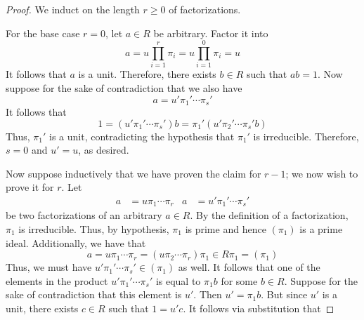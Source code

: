 \documentclass[../notes.tex]{subfiles}
\begin{document}
\begin{itemize}
\begin{proof}


        We induct on the length $r\geq 0$ of factorizations.\par
        For the base case $r=0$, let $a\in R$ be arbitrary. Factor it into
        \begin{equation*}
            a = u\prod_{i=1}^r\pi_i
            = u\prod_{i=1}^0\pi_i
            = u
        \end{equation*}
        It follows that $a$ is a unit. Therefore, there exists $b\in R$ such that $ab=1$. Now suppose for the sake of contradiction that we also have
        \begin{equation*}
            a = u'\pi_1'\cdots\pi_s'
        \end{equation*}
        It follows that
        \begin{equation*}
            1 = (u'\pi_1'\cdots\pi_s')b
            = \pi_1'(u'\pi_2'\cdots\pi_s'b)
        \end{equation*}
        Thus, $\pi_1'$ is a unit, contradicting the hypothesis that $\pi_1'$ is irreducible. Therefore, $s=0$ and $u'=u$, as desired.\par
        Now suppose inductively that we have proven the claim for $r-1$; we now wish to prove it for $r$. Let
        \begin{align*}
            a &= u\pi_1\cdots\pi_r&
            a &= u'\pi_1'\cdots\pi_s'
        \end{align*}
        be two factorizations of an arbitrary $a\in R$. By the definition of a factorization, $\pi_1$ is irreducible. Thus, by hypothesis, $\pi_1$ is prime and hence $(\pi_1)$ is a prime ideal. Additionally, we have that
        \begin{equation*}
            a = u\pi_1\cdots\pi_r
            = (u\pi_2\cdots\pi_r)\pi_1
            \in R\pi_1
            = (\pi_1)
        \end{equation*}
        Thus, we must have $u'\pi_1'\cdots\pi_s'\in(\pi_1)$ as well. It follows that one of the elements in the product $u'\pi_1'\cdots\pi_s'$ is equal to $\pi_1b$ for some $b\in R$. Suppose for the sake of contradiction that this element is $u'$. Then $u'=\pi_1b$. But since $u'$ is a unit, there exists $c\in R$ such that $1=u'c$. It follows via substitution that

\end{proof}
\end{itemize}
\end{document}
